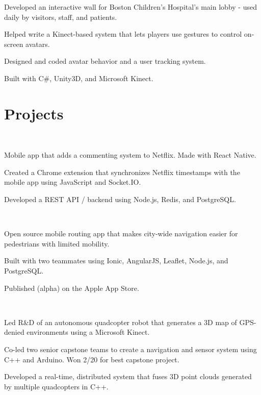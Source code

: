 \documentclass[]{deedy-resume}
\begin{document}
\begin{minipage}[t]{0.61\textwidth}
\begin{tightemize}
\item Developed an interactive wall for Boston Children's Hospital's main lobby - used daily by visitors, staff, and patients.
\item Helped write a Kinect-based system that lets players use gestures to control on-screen avatars.
\item Designed and coded avatar behavior and a user tracking system.
\item Built with C\#, Unity3D, and Microsoft Kinect.
\end{tightemize}


\section{Projects}
 \\
\begin{tightemize}
\item Mobile app that adds a commenting system to Netflix. Made with React Native.
\item Created a Chrome extension that synchronizes Netflix timestamps with the mobile app using JavaScript and Socket.IO.
\item Developed a REST API / backend using Node.js, Redis, and PostgreSQL.
\end{tightemize}
\sectionsep

 \\
\begin{tightemize}
\item Open source mobile routing app that makes city-wide navigation easier for pedestrians with limited mobility.
\item Built with two teammates using Ionic, AngularJS, Leaflet, Node.js, and PostgreSQL.
\item Published (alpha) on the Apple App Store.
\end{tightemize}
\sectionsep

 \\
\begin{tightemize}
\item Led R\&D of an autonomous quadcopter robot that generates a 3D map of GPS-denied environments using a Microsoft Kinect.
\item Co-led two senior capstone teams to create a navigation and sensor system using C++ and Arduino. Won 2/20 for best capstone project.
\item Developed a real-time, distributed system that fuses 3D point clouds generated by multiple quadcopters in C++.
\end{tightemize}
\sectionsep

\end{minipage}
\end{document}
